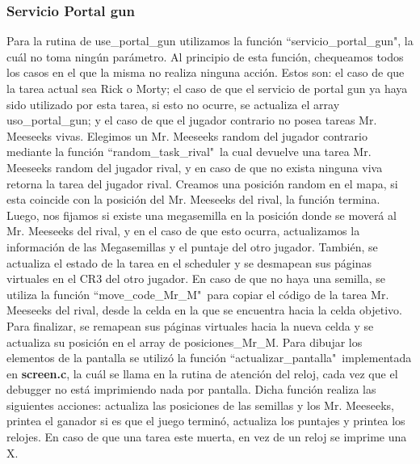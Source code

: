 \documentclass[a4paper]{article}
\begin{document}
\subsubsection{Servicio Portal gun}
\justify
Para la rutina de use_portal_gun utilizamos la función ``servicio_portal_gun", la cuál no toma ningún parámetro. Al principio de esta función, chequeamos todos los casos en el que la misma no realiza ninguna acción. Estos son: el caso de que la tarea actual sea Rick o Morty; el caso de que el servicio de portal gun ya haya sido utilizado por esta tarea, si esto no ocurre, se actualiza el array uso_portal_gun; y el caso de que el jugador contrario no posea tareas Mr. Meeseeks vivas. Elegimos un Mr. Meeseeks random del jugador contrario mediante la función ``random_task_rival"\, la cual devuelve una tarea Mr. Meeseeks random del jugador rival, y en caso de que no exista ninguna viva retorna la tarea del jugador rival. Creamos una posición random en el mapa, si esta coincide con la posición del Mr. Meeseeks del rival, la función termina. Luego, nos fijamos si existe una megasemilla en la posición donde se moverá al Mr. Meeseeks del rival, y en el caso de que esto ocurra, actualizamos la información de las Megasemillas y el puntaje del otro jugador. También, se actualiza el estado de la tarea en el scheduler y se desmapean sus páginas virtuales en el CR3 del otro jugador. En caso de que no haya una semilla, se utiliza la función ``move_code_Mr_M"\  para copiar el código de la tarea Mr. Meeseeks del rival, desde la celda en la que se encuentra hacia la celda objetivo. Para finalizar, se remapean sus páginas virtuales hacia la nueva celda y se actualiza su posición en el array de posiciones_Mr_M.
\justify
Para dibujar los elementos de la pantalla se utilizó la función ``actualizar_pantalla"\ implementada en \textbf{screen.c}, la cuál se llama en la rutina de atención del reloj, cada vez que el debugger no está imprimiendo nada por pantalla. Dicha función realiza las siguientes acciones: actualiza las posiciones de las semillas y los Mr. Meeseeks, printea el ganador si es que el juego terminó, actualiza los puntajes y printea los relojes. En caso de que una tarea este muerta, en vez de un reloj se imprime una X.
\end{document}
